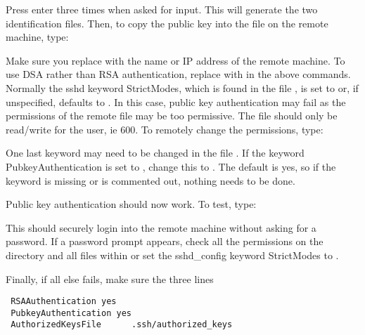  Press enter three times when asked for input.  This will generate the two identification files.  Then, to copy the public key into the  file on the remote machine, type: 
  


 Make sure you replace  with the name or IP address of the remote machine.  To use DSA rather than RSA authentication, replace  with  in the above commands. Normally the sshd keyword StrictModes, which is found in the file , is set to  or, if unspecified, defaults to .  In this case, public key authentication may fail as the permissions of the remote file  may be too permissive.  The file should only be read/write for the user, ie 600.  To remotely change the permissions, type: 
  


 One last keyword may need to be changed in the file .  If the keyword PubkeyAuthentication is set to , change this to .  The default is yes, so if the keyword is missing or is commented out, nothing needs to be done. 
  

 Public key authentication should now work.  To test, type: 
  


 This should securely login into the remote machine without asking for a password.  If a password prompt appears, check all the permissions on the directory  and all files within or set the sshd\_config keyword StrictModes to . 
  




 Finally, if all else fails, make sure the three lines 
  

 {\footnotesize \begin{verbatim} 
 RSAAuthentication yes 
 PubkeyAuthentication yes 
 AuthorizedKeysFile      .ssh/authorized_keys 
 \end{verbatim}} 

